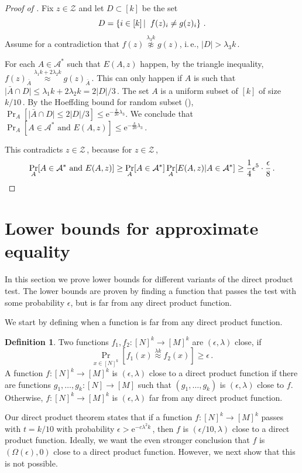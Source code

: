 \documentclass[11pt]{article}
\numberwithin{equation}{section}
\theoremstyle{definition}
\newtheorem{definition}[theorem]{Definition}
\theoremstyle{plain}
\newcommand{\eee}{\mathrm e}
\newcommand{\ie}{i.\,e.}
\newcommand{\Prob}[2][]{\Pr_{{#1}}\left[#2\right]} %
\newcommand{\brac}[1]{[#1]} %
\newcommand{\abs}[1]{\lvert#1\rvert} %
\newcommand\sett[2]{\left\{ #1 \left| \; \vphantom{#1 #2} \right. #2  \right\}} %
\newcommand\f{f} %
\newcommand\pf{g} %
\newcommand\neql[1]{\stackrel{{#1}}{ \approx}} %
\newcommand\neqg[1]{\stackrel{{#1}}{ \not\approx}} %
\newcommand\rest[1]{{\bar{#1}}}  %
\newcommand\zi{\mathcal{Z}} %
\begin{document}
\begin{proof}[Proof of ]
Fix $z\in\zi$ and let $D\subset [k]$ be the set
	\[D = \sett{i\in[k]}{\f(z)_i\neq\pf(z)_i} \,.\] %
Assume %
for   %
a contradiction that $\f(z)\neqg{\lambda_3 k}\pf(z)$, \ie, $\abs{D} >\lambda_3 k$\,.
	
For each $A\in\mathcal{A}^*$ such that $E(A,z)$ happen, by the triangle inequality,
$\f(z)_{\rest{A}} \neql{\lambda_1 k + 2\lambda_2 k} \pf(z)_{\rest{A}}$\,.
This can only happen if $A$ is such that $\abs{\rest{A}\cap D}\leq \lambda_1 k + 2\lambda_2 k =
%
2\abs{D}/3$\,. %
The set $A$ is a uniform subset of $[k]$ of size $k/10$\,. By
the  %
%
%
%
Hoeffding bound for random subset (), %
%
$\Pr_A[\abs{\rest{A}\cap D}\leq 
%
2\abs{D}/3]%
\leq \eee^{-\frac{ k}{20}\lambda_3}.$
We conclude that $\Pr_A[A\in \mathcal{A}^*\textrm{ and }E(A,z)]\leq \eee^{-\frac{ k}{20}\lambda_3}$\,.

This contradicts $z\in\zi$\,, because for $z\in\zi$\,,
%
\[\Pr_A[A\in \mathcal{A}^*\textrm{ and }E(A,z)]\geq \Pr_A[A\in\mathcal{A}^*]\Pr_A[E(A,z)| A\in\mathcal{A}^*]\geq \frac{1}{4}\epsilon^5 \cdot \frac{\epsilon}{8}\,.  \qedhere \]   %
\end{proof}


\section{Lower bounds for approximate equality} \label{sec:diss}
In this section we prove lower bounds for different variants of the direct product test. The lower bounds are proven by finding a  function that passes the test with some probability $\epsilon$, but is far from any direct product function.

We start by defining when a function is far from any direct product function.
\begin{definition}
	Two functions $\f_1,\f_2:[N]^k\rightarrow[M]^k$ are $(\epsilon,\lambda)$ close, if
	\[ \Prob[x\in\brac{N}^k]{\f_1(x)\neql{\lambda k} \f_2(x)}\geq \epsilon\,. \] %
	A function $\f:[N]^k\rightarrow[M]^k$ is $(\epsilon,\lambda)$ close to a direct product function if there are functions $\pf_1,\ldots,\pf_k:[N]\rightarrow[M]$ such that $(g_1,\ldots, g_k)$ is $(\epsilon,\lambda)$ close to $\f$. Otherwise,  $\f:[N]^k\rightarrow[M]^k$ is $(\epsilon,\lambda)$ far from any direct product function.
\end{definition}

Our direct product theorem states that if a function $\f:[N]^k\rightarrow[M]^k$ passes  with $t=k/10$ with probability $\epsilon > \eee^{-c \lambda^2 k}$\,, then $\f$ is 
%
$({\epsilon}/{10},\lambda)$ %
 close to a direct product function.
Ideally, we want the even stronger conclusion that $\f$ is $(\Omega(\epsilon),0)$ close to a direct product function. However, we next show that this is not possible.
\end{document}
